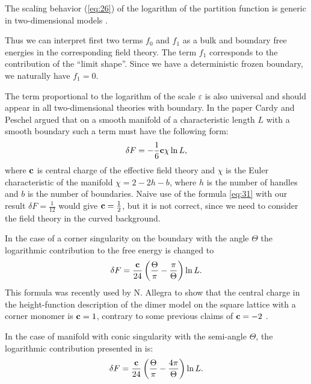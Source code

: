 \documentclass{article}
\begin{document}
The scaling behavior (\ref{eq:26}) of the logarithm of the partition function is generic in two-dimensional
models \cite{cardy1988finite}.

Thus we can interpret first two terms $f_{0}$ and $f_{1}$ as a bulk
and boundary free energies in the corresponding field theory. The term
$f_1$ corresponds to the contribution of the ``limit shape''. Since we
have a deterministic frozen boundary, we naturally have $f_{1}=0$.

The term proportional to the logarithm of the scale $\varepsilon$ is also universal
\cite{cardy1988finite} and should appear in all two-dimensional theories with boundary. In the paper
\cite{cardy1988finite} Cardy and Peschel argued that on a smooth manifold of a characteristic length $L$ with a smooth
boundary such a term must have the following form:
\begin{equation}
  \label{eq:31}
  \delta F = -\frac{1}{6}{\bf c} \chi \ln L,
\end{equation}
where ${\bf c}$ is central charge of the effective field theory and
$\chi$ is the Euler characteristic of the manifold $\chi=2-2 h-b$,
where $h$ is the number of handles and $b$ is the number of
boundaries. Naive use of the formula \eqref{eq:31} with our result
$\delta F=\frac{1}{12}$ would give ${\bf c}=\frac{1}{2}$, but it is
not correct, since we need to consider the field theory in the curved
background.

In the case of a corner singularity on the boundary with the angle
$\Theta$ the logarithmic contribution to the free energy is changed to
\begin{equation}
  \label{eq:86}
  \delta F = \frac{{\bf c}}{24}\left(\frac{\Theta}{\pi}-\frac{\pi}{\Theta}\right) \ln L.
\end{equation}
This formula was recently used by N. Allegra \cite{allegra2015exact} to show that the central charge
in the height-function description of the dimer model on the square lattice with a corner monomer is
${\bf c}=1$, contrary to some previous claims of ${\bf c}=-2$ \cite{morin2016integrability}.

In the case of manifold with conic singularity with the semi-angle
$\Theta$, the logarithmic contribution presented in \cite{cardy1988finite} is:
\begin{equation}
  \label{eq:91}
  \delta F = \frac{{\bf c}}{24}\left(\frac{\Theta}{\pi}-\frac{4\pi}{\Theta}\right) \ln L.
\end{equation}
\end{document}
